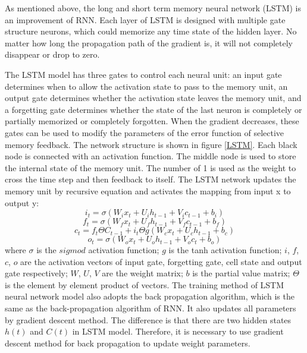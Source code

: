 As mentioned above, the long and short term memory neural network (LSTM) \cite{smagulova2019survey} \cite{sahoo2019long} is an improvement of RNN. Each layer of LSTM is designed with multiple gate structure neurons, which could memorize any time state of the hidden layer. No matter how long the propagation path of the gradient is, it will not completely disappear or drop to zero. 

The LSTM model has three gates to control each neural unit: an input gate determines when to allow the activation state to pass to the memory unit, an output gate determines whether the activation state leaves the memory unit, and a forgetting gate determines whether the state of the last neuron is completely or partially memorized or completely forgotten. When the gradient decreases, these gates can be used to modify the parameters of the error function of selective memory feedback. The network structure is shown in figure \ref{LSTM}. Each black node is connected with an activation function. The middle node is used to store the internal state of the memory unit. The number of 1 is used as the weight to cross the time step and then feedback to itself. The LSTM network updates the memory unit by recursive equation and activates the mapping from input x to output y: \\

\begin{equation}
i_t = \sigma (W_i x_t + U_i h_{t-1} + V_i c_{t-1} + b_i)
\end{equation}
\begin{equation}
f_t = \sigma (W_f x_t + U_f h_{t-1} + V_f c_{t-1} + b_f)
\end{equation}
\begin{equation}
c_t = f_t \Theta C_{t-1} + i_t \Theta g (W_c x_t + U_c h_{t-1}+b_c)
\end{equation}
\begin{equation}
o_t = \sigma (W_o x_t + U_o h_{t-1} + V_o c_t + b_o)
\end{equation}
where $\sigma$ is the $sigmod$ activation function; $g$ is the tanh activation function; $i$, $f$, $c$, $o$ are the activation vectors of input gate, forgetting gate, cell state and output gate respectively; $W$, $U$, $V$ are the weight matrix; $b$ is the partial value matrix; $\Theta$ is the element by element product of vectors.
The training method of LSTM neural network model also adopts the back propagation algorithm, which is the same as the back-propagation algorithm of RNN. It also updates all parameters by gradient descent method. The difference is that there are two hidden states $h(t)$ and $C(t)$ in LSTM model. Therefore, it is necessary to use gradient descent method for back propagation to update weight parameters.

